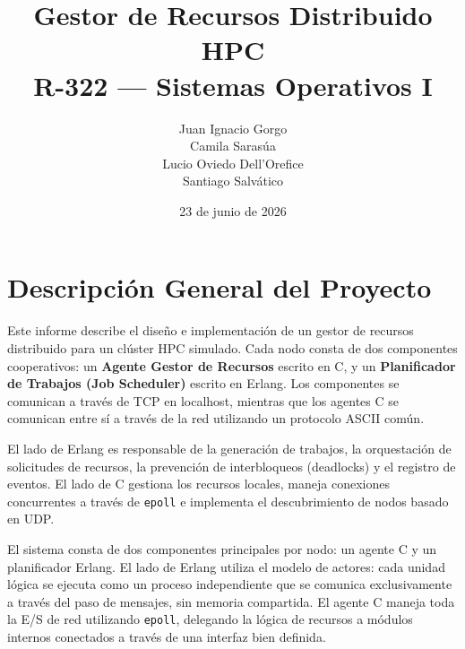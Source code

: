 \documentclass[12pt,a4paper]{article}
\title{\textbf{Gestor de Recursos Distribuido HPC}\\[0.3em]\normalsize R-322 --- Sistemas Operativos I}
\author{
Juan Ignacio Gorgo \\
Camila Sarasúa \\
Lucio Oviedo Dell'Orefice \\
Santiago Salvático
}
\date{23 de junio de 2026}
\begin{document}
\maketitle
\thispagestyle{fancy}
\tableofcontents
\newpage

\section{Descripción General del Proyecto}

Este informe describe el diseño e implementación de un gestor de recursos distribuido para un clúster HPC simulado. Cada nodo consta de dos componentes cooperativos: un \textbf{Agente Gestor de Recursos} escrito en C, y un \textbf{Planificador de Trabajos (Job Scheduler)} escrito en Erlang. Los componentes se comunican a través de TCP en localhost, mientras que los agentes C se comunican entre sí a través de la red utilizando un protocolo ASCII común.

El lado de Erlang es responsable de la generación de trabajos, la orquestación de solicitudes de recursos, la prevención de interbloqueos (deadlocks) y el registro de eventos. El lado de C gestiona los recursos locales, maneja conexiones concurrentes a través de \texttt{epoll} e implementa el descubrimiento de nodos basado en UDP.
 
El sistema consta de dos componentes principales por nodo: un agente C y un planificador Erlang. El lado de Erlang utiliza el modelo de actores: cada unidad lógica se ejecuta como un proceso independiente que se comunica exclusivamente a través del paso de mensajes, sin memoria compartida. El agente C maneja toda la E/S de red utilizando \texttt{epoll}, delegando la lógica de recursos a módulos internos conectados a través de una interfaz bien definida.
\end{document}
